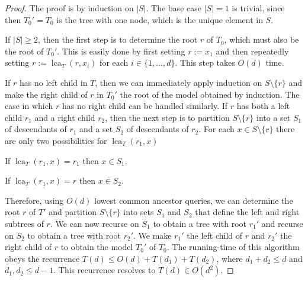 \documentclass{patmorin}
\DeclareMathOperator{\lca}{lca}
\begin{document}
\begin{proof}
  The proof is by induction on $|S|$.  The base case $|S|=1$ is trivial, since then $T_0'=T_0$ is the tree with one node, which is the unique element in $S$.

  If $|S|\ge 2$, then the first step is to determine the root $r$ of $T_0$, which must also be the root of $T_0'$.  This is easily done by first setting $r:=x_1$ and then repeatedly setting $r:=\lca_{T}(r,x_i)$ for each $i\in\{1,\ldots,d\}$. This step takes $O(d)$ time.

  If $r$ has no left child in $T$, then we can immediately apply induction on $S\setminus\{r\}$ and make the right child of $r$ in $T_0'$ the root of the model obtained by induction.  The case in which $r$ has no right child can be handled similarly. If $r$ has both a left child $r_1$ and a right child $r_2$, then the next step is to partition $S\setminus\{r\}$ into a set $S_1$ of descendants of $r_1$ and a set $S_2$ of descendants of $r_2$.   For each $x\in S\setminus\{r\}$ there are only two possibilities for $\lca_{T}(r_1,x)$
  \begin{compactenum}
    \item If $\lca_{T}(r_1,x)=r_1$ then $x\in S_1$.
    \item If $\lca_{T}(r_1,x)=r$ then $x\in S_2$.
  \end{compactenum}
  Therefore, using $O(d)$ lowest common ancestor queries, we can determine the root $r$ of $T'$ and partition $S\setminus\{r\}$ into sets $S_1$ and $S_2$ that define the left and right subtrees of $r$.  We can now recurse on $S_1$ to obtain a tree with root $r_1'$ and recurse on $S_2$ to obtain a tree with root $r_2'$.  We make $r_1'$ the left child of $r$ and $r_2'$ the right child of $r$ to obtain the model $T_0'$ of $T_0$.  The running-time of this  algorithm obeys the recurrence $T(d)\le O(d)+T(d_1) + T(d_2)$, where $d_1 + d_2 \leq d$ and $d_1, d_2 \leq d-1$.  This recurrence resolves to $T(d)\in O(d^2)$.
\end{proof}

\end{document}
